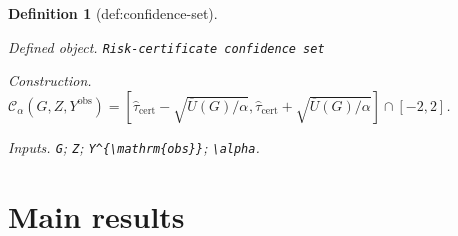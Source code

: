 \documentclass{article}
\newtheorem{definition}{Definition}
\begin{document}
\begin{definition}[def:confidence-set]\label{def:confidence-set}
\par\smallskip\noindent\emph{Defined object.} \texttt{Risk-\allowbreak{}certificate confidence set}
\par\smallskip\noindent\emph{Construction.} \(\mathcal C_\alpha(G,Z,Y^{\mathrm{obs}})=[\widehat\tau_{\mathrm{cert}}-\sqrt{\overline U(G)/\alpha},\widehat\tau_{\mathrm{cert}}+\sqrt{\overline U(G)/\alpha}]\cap[-2,2]\).
\par\smallskip\noindent\emph{Inputs.} \texttt{G}; \texttt{Z}; \texttt{Y\textasciicircum{}\{\textbackslash{}\allowbreak{}mathrm\{obs\}\allowbreak{}\}\allowbreak{}}; \texttt{\textbackslash{}\allowbreak{}alpha}.
\end{definition}

\section{Main results}
\end{document}

